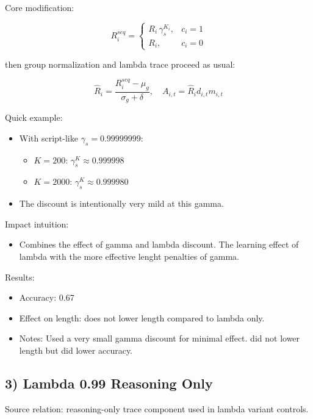 \documentclass[
]{article}
\providecommand{\tightlist}{%
  \setlength{\itemsep}{0pt}\setlength{\parskip}{0pt}}
\begin{document}
Core modification:

\[
R_i^{seq} =
\begin{cases}
R_i\,\gamma_s^{K_i}, & c_i=1 \\
R_i, & c_i=0
\end{cases}
\]

then group normalization and lambda trace proceed as usual:

\[
\hat{R}_i = \frac{R_i^{seq}-\mu_g}{\sigma_g+\delta},\quad
A_{i,t}=\hat{R}_i d_{i,t}m_{i,t}
\]

Quick example:

\begin{itemize}
\item
  With script-like \(\gamma_s=0.99999999\):

  \begin{itemize}
  \tightlist
  \item
    \(K=200\): \(\gamma_s^K \approx 0.999998\)
  \item
    \(K=2000\): \(\gamma_s^K \approx 0.999980\)
  \end{itemize}
\item
  The discount is intentionally very mild at this gamma.
\end{itemize}

Impact intuition:

\begin{itemize}
\tightlist
\item
  Combines the effect of gamma and lambda discount. The learning effect
  of lambda with the more effective lenght penalties of gamma.
\end{itemize}

Results:

\begin{itemize}
\tightlist
\item
  Accuracy: 0.67
\item
  Effect on length: does not lower length compared to lambda only.
\item
  Notes: Used a very small gamma discount for minimal effect. did not
  lower length but did lower accuracy.
\end{itemize}

\subsection{3) Lambda 0.99 Reasoning
Only}\label{lambda-0.99-reasoning-only}

Source relation: reasoning-only trace component used in lambda variant
controls.
\end{document}
